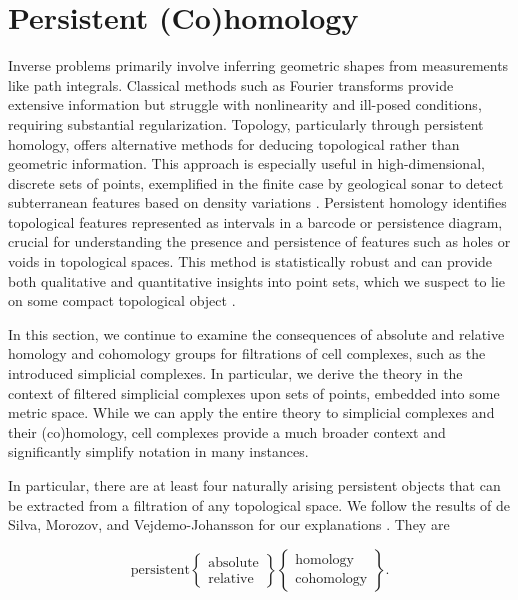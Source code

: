 \section{Persistent (Co)homology}
\label{Persistent(Co)homology}
Inverse problems primarily involve inferring geometric shapes from measurements like
path integrals. Classical methods such as Fourier transforms provide extensive
information but struggle with nonlinearity and ill-posed conditions, requiring substantial
regularization. Topology, particularly through persistent homology, offers
alternative methods for deducing topological rather than geometric information. This
approach is especially useful in high-dimensional, discrete sets of points, exemplified
in the finite case by geological sonar to detect subterranean features based on density
variations \cite[\S 1]{de2011dualities}. Persistent homology identifies
topological features represented as intervals in a barcode or persistence
diagram, crucial for understanding the presence and persistence of features such
as holes or voids in topological spaces. This method is statistically robust and
can provide both qualitative and quantitative insights into point sets, which we
suspect to lie on some compact topological object \cite{chazal2014persistence,chazal2009proximity}.

In this section, we continue to examine the consequences of absolute and relative
homology and cohomology groups for filtrations of cell complexes, such as the introduced
simplicial complexes. In particular, we derive the theory in the context of filtered
simplicial complexes upon sets of points, embedded into some metric space. While
we can apply the entire theory to simplicial complexes and their (co)homology, cell
complexes provide a much broader context and significantly simplify notation in many
instances.

In particular, there are at least four naturally arising persistent objects that
can be extracted from a filtration of any topological space. We follow the results
of de Silva, Morozov, and Vejdemo-Johansson for our explanations \cite[\S 1]{de2011dualities}.
They are

\begin{equation*}
	\text{persistent}
	\begin{Bmatrix}
		\text{absolute} \\
		\text{relative}
	\end{Bmatrix}
	\begin{Bmatrix}
		\text{homology}   \\
		\text{cohomology}
	\end{Bmatrix}.
\end{equation*}

